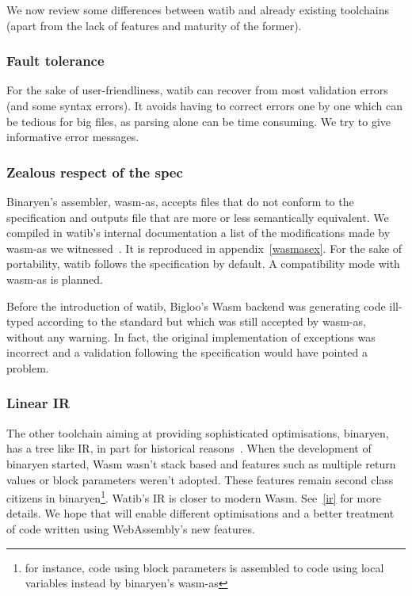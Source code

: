 \documentclass[10pt]{article}
\begin{document}
We now review some differences between \textsf{watib} and already existing
toolchains (apart from the lack of features and maturity of the former).
\subsubsection{Fault tolerance}
For the sake of user-friendliness, \textsf{watib} can recover from most
validation errors (and some syntax errors). It avoids having to correct errors
one by one which can be tedious for big files, as parsing alone can be time
consuming. We try to give informative error messages.

\subsubsection{{Zealous\protect\footnotemark} respect of the spec}
Binaryen's assembler, \textsf{wasm-as}, accepts files that do not conform to the
specification and outputs file that are more or less semantically equivalent. We
compiled in watib's internal documentation a list of the modifications made by
\textsf{wasm-as} we witnessed~\cite{WasmAsExtension}. It is reproduced in
appendix~\ref{wasmasex}. For the sake of portability, watib follows the
specification by default. A compatibility mode with \textsf{wasm-as} is
planned.

Before the introduction of watib, Bigloo's Wasm backend was generating code
ill-typed according to the standard but which was still accepted by
\textsf{wasm-as}, without any warning. In fact, the original implementation of
exceptions was incorrect and a validation following the specification would have
pointed a problem.

\subsubsection{Linear IR}
The other toolchain aiming at providing sophisticated optimisations, binaryen,
has a tree like IR, in part for historical reasons~\cite{BinaryenIR}. When the
development of binaryen started, Wasm wasn't stack based and features such as
multiple return values or block parameters weren't adopted. These features
remain second class citizens in binaryen\footnote{for instance, code using block
parameters is assembled to code using local variables instead by binaryen's
\textsf{wasm-as}}. Watib's IR is closer to modern Wasm. See~\ref{ir} for more
details. We hope that will enable different optimisations and a better treatment
of code written using WebAssembly's new features.
\end{document}
